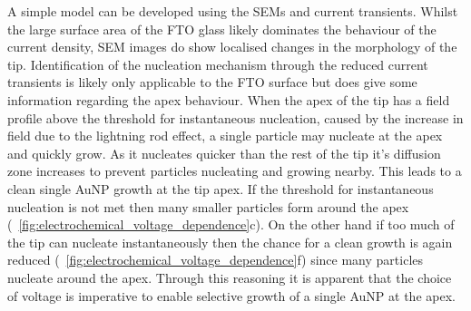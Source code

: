 \documentclass{article}
\begin{document}
A simple model can be developed using the SEMs and current transients. Whilst the large surface area of the FTO glass likely dominates the behaviour of the current density, SEM images do show localised changes in the morphology of the tip. Identification of the nucleation mechanism through the reduced current transients is likely only applicable to the FTO surface but does give some information regarding the apex behaviour. When the apex of the tip has a field profile above the threshold for instantaneous nucleation, caused by the increase in field due to the lightning rod effect, a single particle may nucleate at the apex and quickly grow. As it nucleates quicker than the rest of the tip it's diffusion zone increases to prevent particles nucleating and growing nearby. This leads to a clean single AuNP growth at the tip apex. If the threshold for instantaneous nucleation is not met then many smaller particles form around the apex (\figurename~\ref{fig:electrochemical_voltage_dependence}c). On the other hand if too much of the tip can nucleate instantaneously then the chance for a clean growth is again reduced (\figurename~\ref{fig:electrochemical_voltage_dependence}f) since many particles nucleate around the apex. Through this reasoning it is apparent that the choice of voltage is imperative to enable selective growth of a single AuNP at the apex.
\end{document}
